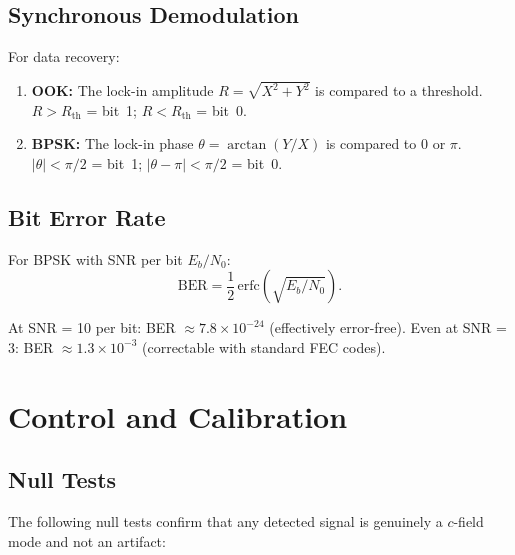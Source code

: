 \documentclass[11pt,letterpaper]{article}
\newcommand{\ee}[1]{\times 10^{#1}}
\begin{document}
\subsection{Synchronous Demodulation}

For data recovery:
\begin{enumerate}
\item \textbf{OOK:} The lock-in amplitude $R = \sqrt{X^2+Y^2}$
is compared to a threshold. $R > R_\text{th}$ = bit~1;
$R < R_\text{th}$ = bit~0.

\item \textbf{BPSK:} The lock-in phase $\theta = \arctan(Y/X)$
is compared to $0$ or $\pi$. $|\theta| < \pi/2$ = bit~1;
$|\theta - \pi| < \pi/2$ = bit~0.
\end{enumerate}

\subsection{Bit Error Rate}

For BPSK with SNR per bit $E_b/N_0$:
\begin{equation}
\text{BER} = \frac{1}{2}\,\text{erfc}\!\left(
\sqrt{E_b/N_0}\right).
\label{eq:BER}
\end{equation}

At SNR = 10 per bit: BER $\approx 7.8\ee{-24}$ (effectively
error-free). Even at SNR = 3: BER $\approx 1.3\ee{-3}$ (correctable
with standard FEC codes).

\section{Control and Calibration}
\label{sec:control}

\subsection{Null Tests}

The following null tests confirm that any detected signal is
genuinely a $c$-field mode and not an artifact:
\end{document}
